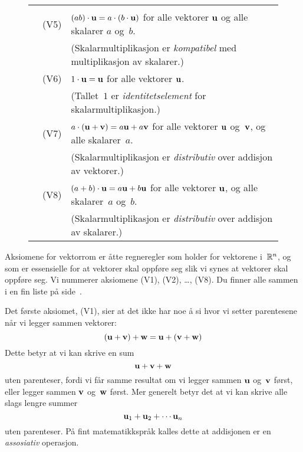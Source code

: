 \begin{figure*}[p]
\begin{center}
\begin{minipage}{.9\textwidth}
\begin{center}
\begin{tabular}{rll}
{}
\\[-4pt]
& {\large {\LARGE(}V5{\LARGE)}} &
$(ab) \cdot \mathbf{u} = a \cdot (b \cdot \mathbf{u})$
for alle vektorer $\mathbf{u}$ og alle skalarer $a$ og~$b$.
\\[4pt]
&&{\small (Skalarmultiplikasjon er \emph{kompatibel} med multiplikasjon av skalarer.)}
\\[10pt]
& {\large {\LARGE(}V6{\LARGE)}} &
$1 \cdot \mathbf{u} = \mathbf{u}$
for alle vektorer $\mathbf{u}$.
\\[4pt]
&&{\small (Tallet~$1$ er \emph{identitetselement} for skalarmultiplikasjon.)}
\\[10pt]
& {\large {\LARGE(}V7{\LARGE)}} &
$a \cdot (\mathbf{u} + \mathbf{v}) = a \mathbf{u} + a \mathbf{v}$
for alle vektorer $\mathbf{u}$ og~$\mathbf{v}$, og alle skalarer~$a$.
\\[4pt]
&&{\small (Skalarmultiplikasjon er \emph{distributiv} over addisjon av vektorer.)}
\\[10pt]
& {\large {\LARGE(}V8{\LARGE)}} &
$(a + b) \cdot \mathbf{u} = a \mathbf{u} + b \mathbf{u}$
for alle vektorer $\mathbf{u}$, og alle skalarer~$a$ og~$b$.
\\[4pt]
&&{\small (Skalarmultiplikasjon er \emph{distributiv} over addisjon av skalarer.)}
\end{tabular}
\hspace{10pt}\hbox{}

\vspace{30pt}
\end{center}
\end{minipage}
\end{center}
\label{fig:aksiomene}
\end{figure*}

Aksiomene for vektorrom er åtte regneregler som holder for vektorene
i~$\mathbb{R}^n$, og som er essensielle for at vektorer skal oppføre seg slik
vi synes at vektorer skal oppføre seg.  Vi nummerer aksiomene (V1),
(V2), \ldots, (V8).  Du finner alle sammen i en fin liste på
side~\pageref{fig:aksiomene}.

Det første aksiomet, (V1), sier at det ikke har noe å si hvor vi
setter parentesene når vi legger sammen vektorer:
\[
(\mathbf{u} + \mathbf{v}) + \mathbf{w} = \mathbf{u} + (\mathbf{v} + \mathbf{w})
\]
Dette betyr at vi kan skrive en sum
\[
\mathbf{u} + \mathbf{v} + \mathbf{w}
\]
uten parenteser, fordi vi får samme resultat om vi legger sammen
$\mathbf{u}$ og~$\mathbf{v}$ først, eller legger sammen $\mathbf{v}$ og~$\mathbf{w}$
først.  Mer generelt betyr det at vi kan skrive alle slags lengre
summer
\[
\mathbf{u}_1 + \mathbf{u}_2 + \cdots \mathbf{u}_n
\]
uten parenteser.  På fint matematikkspråk kalles dette at addisjonen
er en \emph{assosiativ} operasjon.

